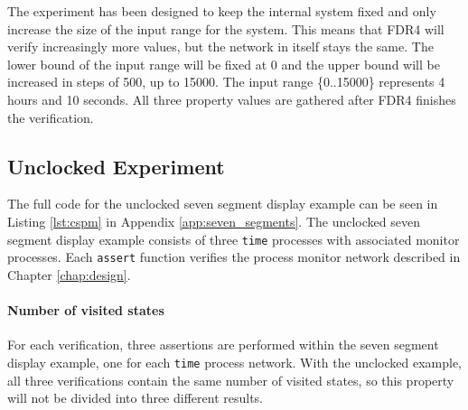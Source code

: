 The experiment has been designed to keep the internal system fixed and only increase the size of the input range for the system. This means that FDR4 will verify increasingly more values, but the network in itself stays the same.
The lower bound of the input range will be fixed at 0 and the upper bound will be increased in steps of 500, up to 15000. The input range \{0..15000\} represents 4 hours and 10 seconds. All three property values are gathered after FDR4 finishes the verification.
\subsection{Unclocked Experiment}
The full code for the unclocked seven segment display example can be seen in Listing \ref{lst:cspm} in Appendix \ref{app:seven_segments}.
The unclocked seven segment display example consists of three \texttt{time} processes with associated monitor processes. Each \texttt{assert} function verifies the process monitor network described in Chapter \ref{chap:design}.
\paragraph{Number of visited states}
For each verification, three assertions are performed within the seven segment display example, one for each \texttt{time} process network. With the unclocked example, all three verifications contain the same number of visited states, so this property will not be divided into three different results.\\

